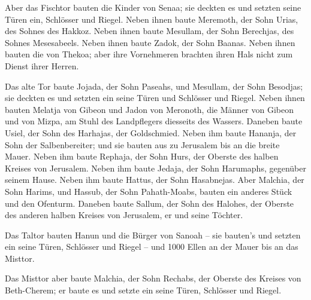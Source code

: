  Aber das Fischtor bauten die Kinder von Senaa; sie
deckten es und setzten seine Türen ein, Schlösser und Riegel.
 Neben ihnen baute Meremoth, der Sohn Urias, des Sohnes
des Hakkoz. Neben ihnen baute Mesullam, der Sohn Berechjas, des Sohnes
Mesesabeels. Neben ihnen baute Zadok, der Sohn Baanas. 
Neben ihnen bauten die von Thekoa; aber ihre Vornehmeren brachten ihren
Hals nicht zum Dienst ihrer Herren.

 Das alte Tor baute Jojada, der Sohn Paseahs, und
Mesullam, der Sohn Besodjas; sie deckten es und setzten ein seine Türen
und Schlösser und Riegel.  Neben ihnen bauten Melatja von
Gibeon und Jadon von Meronoth, die Männer von Gibeon und von Mizpa, am
Stuhl des Landpflegers diesseits des Wassers.  Daneben
baute Usiel, der Sohn des Harhajas, der Goldschmied. Neben ihm baute
Hananja, der Sohn der Salbenbereiter; und sie bauten aus zu Jerusalem
bis an die breite Mauer.  Neben ihm baute Rephaja, der
Sohn Hurs, der Oberste des halben Kreises von Jerusalem. 
Neben ihm baute Jedaja, der Sohn Harumaphs, gegenüber seinem Hause.
Neben ihm baute Hattus, der Sohn Hasabnejas.  Aber
Malchia, der Sohn Harims, und Hassub, der Sohn Pahath-Moabs, bauten ein
anderes Stück und den Ofenturm.  Daneben baute Sallum,
der Sohn des Halohes, der Oberste des anderen halben Kreises von
Jerusalem, er und seine Töchter.

 Das Taltor bauten Hanun und die Bürger von Sanoah -- sie
bauten's und setzten ein seine Türen, Schlösser und Riegel -- und 1000
Ellen an der Mauer bis an das Misttor.

 Das Misttor aber baute Malchia, der Sohn Rechabs, der
Oberste des Kreises von Beth-Cherem; er baute es und setzte ein seine
Türen, Schlösser und Riegel.


